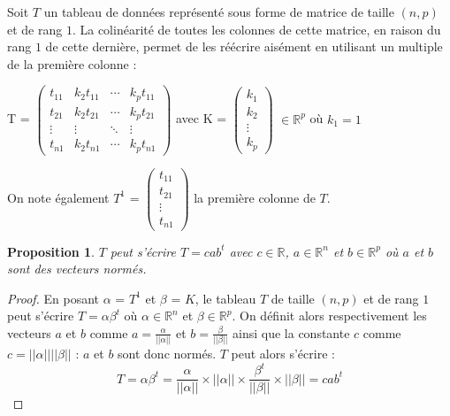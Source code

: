 \documentclass[12pt, openany, fleqn, french]{article}
\newtheorem{prop}[theo]{Proposition}    %
\begin{document}
    Soit $T$ un tableau de données représenté sous forme de matrice de taille $(n,p)$ et de rang $1$. La colinéarité de toutes les colonnes de cette matrice, en raison du rang $1$ de cette dernière, permet de les réécrire aisément en utilisant un multiple de la première colonne :  \\
\begin{center}
    

    T = 
    $\begin{pmatrix} 
    t_{11} & k_{2}t_{11} & \cdots & k_{p}t_{11} \\ 
    t_{21} & k_{2}t_{21} & \cdots & k_{p}t_{21} \\ 
    \vdots & \vdots & \ddots & \vdots \\ 
    t_{n1} & k_{2}t_{n1} & \cdots & k_{p}t_{n1}
    \end{pmatrix}$
    avec 
    K =
    $\begin{pmatrix} 
    k_{1}  \\ 
    k_{2}  \\ 
    \vdots \\ 
    k_{p}
    \end{pmatrix}$ $\in \mathbb{R}^p $
    où $k_{1} = 1$ 
\end{center}

\hspace*{2cm}

    On note également 
    $T^{1}$ = 
    $\begin{pmatrix} 
    t_{11}  \\ 
    t_{21}  \\ 
    \vdots \\ 
    t_{n1}
    \end{pmatrix}$  la première colonne de $T$. \\

    
\begin{prop}
    $T$ peut s'écrire $T= c ab^{t}$ avec $c \in \mathbb{R}$, $a\in\mathbb{R}^{n}$ et $b\in\mathbb{R}^{p}$ où $a$ et $b$ sont des vecteurs normés.
\end{prop}
\begin{proof}
    En posant $\alpha$ = $T^{1}$ et $\beta$ = $K$, le tableau $T$ de taille $(n,p)$ et de rang $1$ peut s'écrire $T = \alpha \beta^{t}$ où $\alpha\in\mathbb{R}^{n}$ et $\beta\in\mathbb{R}^{p}$. On définit alors respectivement les vecteurs $a$ et $b$ comme  $a = \frac{\alpha}{||\alpha||} $ et $b = \frac{\beta}{||\beta||}$ ainsi que la constante $c$ comme $c = ||\alpha|| ||\beta||$ : $a$ et $b$ sont donc normés. $T$ peut alors s'écrire : $$T = \alpha \beta^t = \frac{\alpha}{||\alpha||} \times ||\alpha|| \times \frac{\beta^t}{||\beta||} \times ||\beta|| = cab^t$$
\end{proof}
\end{document}
